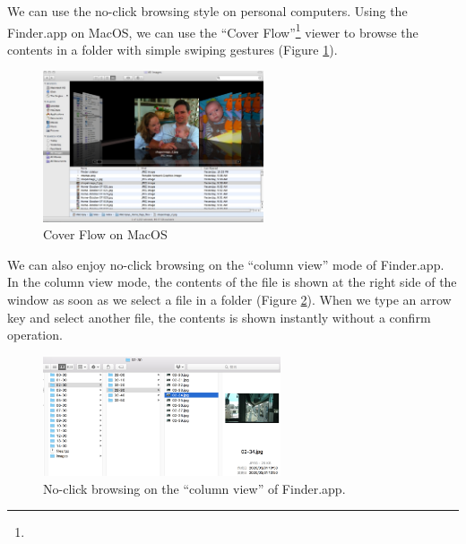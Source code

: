 \documentclass[conference]{IEEEtran}
\begin{document}
We can use the no-click browsing style on personal computers.
Using the Finder.app on MacOS, we can use the ``Cover Flow''\footnote{
} viewer to browse the contents in a folder
with simple swiping gestures (Figure \ref{coverflow}).

\begin{figure}[H]
\centerline{\includegraphics[width=65mm,bb=0 0 1080 740]{figures/902678c6770b5e043baa6f503375749f.jpg}}
\caption{Cover Flow on MacOS}
\label{coverflow}
\end{figure}

We can also enjoy no-click browsing on the ``column view'' mode of Finder.app.
In the column view mode, 
the contents of the file is shown at the right side of the window
as soon as we select a file in a folder (Figure \ref{noclickfinder}).
When we type an arrow key and select another file,
the contents is shown instantly without a confirm operation.

\begin{figure}[H]
\centerline{\includegraphics[width=70mm,bb=0 0 839 423]{figures/10d7ca6c55aa93ebcdab799246e4c087.jpg}}
\caption{No-click browsing on the ``column view'' of Finder.app.}
\label{noclickfinder}
\end{figure}


\end{document}
